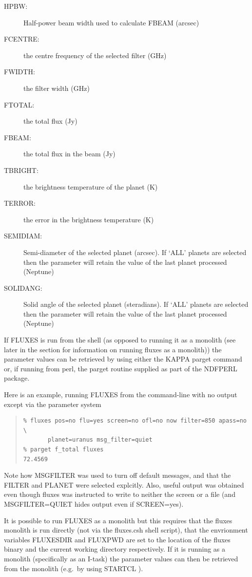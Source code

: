 \documentclass[11pt,twoside]{article}
\newenvironment{myquote}{\begin{quote}\begin{small}}{\end{small}\end{quote}}
\newcommand{\xref}[3]{#1}
\renewcommand{\_}{\texttt{\symbol{95}}}
\begin{document}
\begin{description}
\item[HPBW:] Half-power beam width used to calculate F\_BEAM (arcsec)
\item[F\_CENTRE:] the centre frequency of the selected filter (GHz)
\item[F\_WIDTH:] the filter width (GHz)
\item[F\_TOTAL:] the total flux (Jy)
\item[F\_BEAM:] the total flux in the beam (Jy)
\item[T\_BRIGHT:] the brightness temperature of the planet (K)
\item[T\_ERROR:] the error in the brightness temperature (K)
\item[SEMI\_DIAM:] Semi-diameter of the selected planet (arcsec).
If `ALL' planets are selected then the parameter will retain the
value of the last planet processed (Neptune)
\item[SOLID\_ANG:] Solid angle of the selected planet (steradians).
If `ALL' planets are selected then the parameter will retain the
value of the last planet processed (Neptune)
\end{description}

If FLUXES is run from the shell (as opposed to running it as a
monolith (see later in the section for information on running fluxes
as a monolith)) the parameter values can be retrieved by using either
the \xref{KAPPA}{sun95}{} \xref{parget}{sun95}{PARGET} command
or, if running from perl, the par\_get routine supplied as part of the
\xref{NDFPERL}{sun222}{} package.

Here is an example, running FLUXES from the command-line with
no output except via the parameter system

\begin{myquote}
\begin{verbatim}
% fluxes pos=no flu=yes screen=no ofl=no now filter=850 apass=no \
       planet=uranus msg_filter=quiet
% parget f_total fluxes
72.4569
\end{verbatim}
\end{myquote}

Note how MSG\_FILTER was used to turn off default messages, and
that the FILTER and PLANET were selected explcitly. Also, useful
output was obtained even though fluxes was instructed to write
to neither the screen or a file (and MSG\_FILTER=QUIET hides
output even if SCREEN=yes).


It is possible to run FLUXES as a monolith but this requires
that the fluxes monolith is run directly (not via the fluxes.csh
shell script), that the envrionment variables
FLUXES\_DIR and FLUXPWD are set to the location of the fluxes binary
and the current working directory respectively. If it is running
as a monolith (specifically as an I-task) the parameter values can
then be retrieved from the monolith (e.g.\ by using
\xref{STARTCL}{sun186}{adam_message_system_extension} ).
\end{document}
